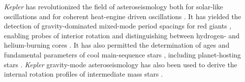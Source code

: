 \documentclass[modern]{aastex62}
\newcommand{\kepler}{\textit{Kepler}\xspace}
\begin{document}

\kepler has revolutionized the field of asteroseismology both for solar-like oscillations \citep{2010PASP..122..131G,2010ApJ...713L.169C} and for coherent heat-engine driven oscillations \citep{2018arXiv180907779A}. It has yielded the detection of gravity-dominated mixed-mode period spacings for red giants \citep{rggmodes,2014A&A...572L...5M}, enabling probes of interior rotation \citep{rggmoderotation,2012A&A...548A..10M,2012ApJ...756...19D} and distinguishing between hydrogen- and helium-burning cores \citep{rggmodehelium,2012A&A...540A.143M}. It has also permitted the determination of ages and fundamental parameters of cool main-sequence stars \citep{silvaages}, including planet-hosting stars \citep{huberplanetages,silvaaguirre2015,2016MNRAS.456.2183D,2018MNRAS.479.4786V}. \kepler gravity-mode asteroseismology has also been used to derive the internal rotation profiles of intermediate mass stars \citep{triana15,vanreeth18}. %
\end{document}
